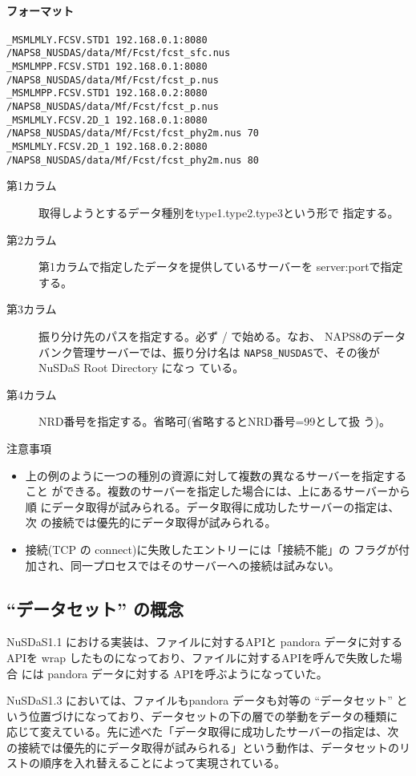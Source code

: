 \paragraph{フォーマット}
\begin{verbatim}
_MSMLMLY.FCSV.STD1 192.168.0.1:8080 /NAPS8_NUSDAS/data/Mf/Fcst/fcst_sfc.nus
_MSMLMPP.FCSV.STD1 192.168.0.1:8080 /NAPS8_NUSDAS/data/Mf/Fcst/fcst_p.nus
_MSMLMPP.FCSV.STD1 192.168.0.2:8080 /NAPS8_NUSDAS/data/Mf/Fcst/fcst_p.nus
_MSMLMLY.FCSV.2D_1 192.168.0.1:8080 /NAPS8_NUSDAS/data/Mf/Fcst/fcst_phy2m.nus 70
_MSMLMLY.FCSV.2D_1 192.168.0.2:8080 /NAPS8_NUSDAS/data/Mf/Fcst/fcst_phy2m.nus 80
\end{verbatim}
\begin{description}
\item[第1カラム] 取得しようとするデータ種別をtype1.type2.type3という形で
	   指定する。
\item[第2カラム] 第1カラムで指定したデータを提供しているサーバーを
	   server:portで指定する。
\item[第3カラム] 振り分け先のパスを指定する。必ず / で始める。なお、
	   NAPS8のデータバンク管理サーバーでは、振り分け名は
	   {\tt NAPS8\_NUSDAS}で、その後が NuSDaS Root Directory になっ
	   ている。
\item[第4カラム] NRD番号を指定する。省略可(省略するとNRD番号=99として扱
	   う)。
\end{description}
注意事項
\begin{itemize}
\item 上の例のように一つの種別の資源に対して複数の異なるサーバーを指定すること
      ができる。複数のサーバーを指定した場合には、上にあるサーバーから順
      にデータ取得が試みられる。データ取得に成功したサーバーの指定は、次
      の接続では優先的にデータ取得が試みられる。
\item 接続(TCP の connect)に失敗したエントリーには「接続不能」の
      フラグが付加され、同一プロセスではそのサーバーへの接続は試みない。
\end{itemize}

\subsection{ ``データセット'' の概念}
NuSDaS1.1 における実装は、ファイルに対するAPIと pandora データに対する
APIを wrap したものになっており、ファイルに対するAPIを呼んで失敗した場合
には pandora データに対する APIを呼ぶようになっていた。

NuSDaS1.3 においては、ファイルもpandora データも対等の ``データセット''
という位置づけになっており、データセットの下の層での挙動をデータの種類に
応じて変えている。先に述べた「データ取得に成功したサーバーの指定は、次
の接続では優先的にデータ取得が試みられる」という動作は、データセットのリ
ストの順序を入れ替えることによって実現されている。


